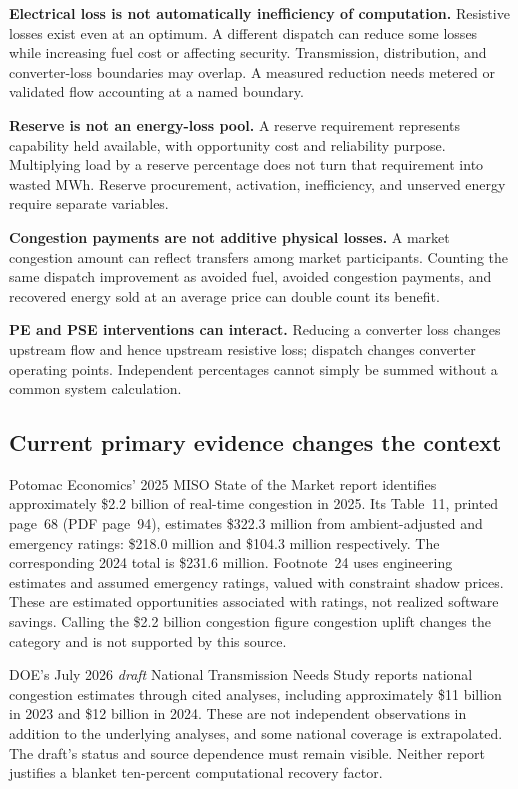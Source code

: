 \documentclass[11pt,letterpaper]{article}
\begin{document}
\textbf{Electrical loss is not automatically inefficiency of computation.} Resistive losses exist even at an optimum. A different dispatch can reduce some losses while increasing fuel cost or affecting security. Transmission, distribution, and converter-loss boundaries may overlap. A measured reduction needs metered or validated flow accounting at a named boundary.

\textbf{Reserve is not an energy-loss pool.} A reserve requirement represents capability held available, with opportunity cost and reliability purpose. Multiplying load by a reserve percentage does not turn that requirement into wasted MWh. Reserve procurement, activation, inefficiency, and unserved energy require separate variables.

\textbf{Congestion payments are not additive physical losses.} A market congestion amount can reflect transfers among market participants. Counting the same dispatch improvement as avoided fuel, avoided congestion payments, and recovered energy sold at an average price can double count its benefit.

\textbf{PE and PSE interventions can interact.} Reducing a converter loss changes upstream flow and hence upstream resistive loss; dispatch changes converter operating points. Independent percentages cannot simply be summed without a common system calculation.

\subsection{Current primary evidence changes the context}
Potomac Economics' 2025 MISO State of the Market report identifies approximately \$2.2 billion of real-time congestion in 2025. Its Table~11, printed page~68 (PDF page~94), estimates \$322.3 million from ambient-adjusted and emergency ratings: \$218.0 million and \$104.3 million respectively. The corresponding 2024 total is \$231.6 million. Footnote~24 uses engineering estimates and assumed emergency ratings, valued with constraint shadow prices. These are estimated opportunities associated with ratings, not realized software savings. Calling the \$2.2 billion congestion figure congestion uplift changes the category and is not supported by this source.\cite{miso}

DOE's July 2026 \emph{draft} National Transmission Needs Study reports national congestion estimates through cited analyses, including approximately \$11 billion in 2023 and \$12 billion in 2024. These are not independent observations in addition to the underlying analyses, and some national coverage is extrapolated. The draft's status and source dependence must remain visible.\cite{doe} Neither report justifies a blanket ten-percent computational recovery factor.
\end{document}
